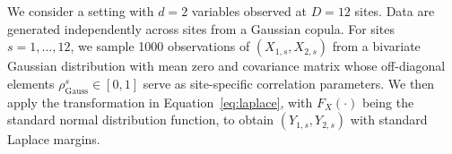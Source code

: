 \documentclass[12pt,compact]{article}
\begin{document}
We consider a setting with $d=2$ variables observed at $D=12$ sites. 
Data are generated independently across sites from a Gaussian copula. 
For sites $s = {1, \ldots, 12}$, we sample 1000 observations of $(X_{1,s}, X_{2,s})$ from a bivariate Gaussian distribution with mean zero and covariance matrix whose off-diagonal elements $\rho^s_{\text{Gauss}} \in [0, 1]$ serve as site-specific correlation parameters.
We then apply the transformation in Equation~\eqref{eq:laplace}, with $F_X(\cdot)$ being the standard normal distribution function, to obtain $(Y_{1,s}, Y_{2,s})$ with standard Laplace margins.

\end{document}
